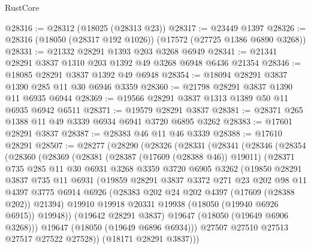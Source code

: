 \begin{lexlean}{RustCore}
\begin{coremodule}
@28316 := @28312 (@18025 (@28313 @23))
@28317 := @23449 @1397
@28326 := @28316 (@18050 (@28317 @192 @1026)) (@17572 (@27725 @1386 @6890 @3268))
@28331 := @21332 @28291 @1393 @203 @3268 @6949
@28341 := @21341 @28291 @3837 @1310 @203 @1392 @49 @3268 @6948 @6436 @21354
@28346 := @18085 @28291 @3837 @1392 @49 @6948
@28354 := @18094 @28291 @3837 @1390 @285 @11 @30 @6946 @3359
@28360 := @21798 @28291 @3837 @1390 @11 @6935 @6944
@28369 := @19566 @28291 @3837 @1313 @1389 @50 @11 @6935 @6942 @6511
@28371 := @19579 @28291 @3837
@28381 := @28371 @265 @1388 @11 @49 @3339 @6934 @6941 @3720 @6895 @3262
@28383 := @17601 @28291 @3837
@28387 := @28383 @46 @11 @46 @3339
@28388 := @17610 @28291
@28507 := @28277
    (@28290
      (@28326
        (@28331
          (@28341
            (@28346
              (@28354
                (@28360
                  (@28369
                    (@28381
                      (@28387 (@17609 (@28388 @46)) @19011)
                      (@28371
                        @735
                        @285
                        @11
                        @30
                        @6931
                        @3268
                        @3359
                        @3720
                        @6905
                        @3262
                        (@19850
                          @28291
                          @3837
                          @735
                          @11
                          @6931
                          (@19859
                            @28291
                            @3837
                            @3372
                            @271
                            @23
                            @202
                            @98
                            @11
                            @4397
                            @3775
                            @6914
                            @6926
                            (@28383 @202 @24 @202 @4397 (@17609 (@28388 @202)) @21394)
                            @19910
                            @19918
                            @20331
                            @19938
                            (@18050 (@19940 @6926 @6915))
                            @19948))
                        (@19642 @28291 @3837)
                        @19647
                        (@18050 (@19649 @6906 @3268)))
                      @19647
                      (@18050 (@19649 @6896 @6934)))
                    @27507
                    @27510
                    @27513
                    @27517
                    @27522
                    @27528))
                (@18171 @28291 @3837)))

\end{coremodule}
\end{lexlean}
